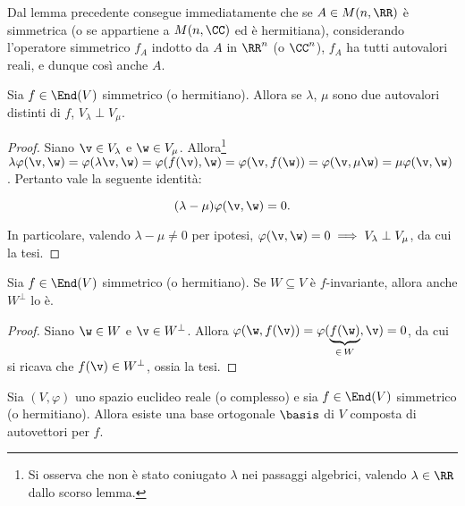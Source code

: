 \begin{remark}
	Dal lemma precedente consegue immediatamente che se $A \in M(n, \RR)$ è simmetrica (o se appartiene a
	$M(n, \CC)$ ed è hermitiana), considerando l'operatore simmetrico $f_A$ indotto da $A$ in $\RR^n$ (o $\CC^n$),
	$f_A$ ha tutti autovalori reali, e dunque così anche $A$. 
\end{remark}

\begin{lemma}
	Sia $f \in \End(V)$ simmetrico (o hermitiano). Allora se $\lambda$, $\mu$ sono due autovalori distinti
	di $f$, $V_\lambda \perp V_\mu$.
\end{lemma}

\begin{proof}
	Siano $\v \in V_\lambda$ e $\w \in V_\mu$. Allora\footnote{Si osserva che non è stato coniugato $\lambda$
		nei passaggi algebrici, valendo $\lambda \in \RR$ dallo scorso lemma.} $\lambda \varphi(\v, \w) = \varphi(\lambda \v, \w) = \varphi(f(\v), \w) = \varphi(\v, f(\w)) = \varphi(\v, \mu \w) = \mu \varphi(\v, \w)$.
	Pertanto vale la seguente identità:
	
	\[ (\lambda - \mu) \varphi(\v, \w) = 0. \]
	
	\vskip 0.05in
	
	In particolare, valendo $\lambda - \mu \neq 0$ per ipotesi, $\varphi(\v, \w) = 0 \implies V_\lambda \perp V_\mu$,
	da cui la tesi.
\end{proof}

\begin{lemma}
	Sia $f \in \End(V)$ simmetrico (o hermitiano). Se $W \subseteq V$ è $f$-invariante, allora anche
	$W^\perp$ lo è.
\end{lemma}

\begin{proof}
	Siano $\w \in W$ e $\v \in W^\perp$. Allora $\varphi(\w, f(\v)) = \varphi(\underbrace{f(\w)}_{\in \, W}, \v) = 0$, da cui si ricava che $f(\v) \in W^\perp$, ossia la tesi.
\end{proof}

\begin{theorem} 
	Sia $(V, \varphi)$ uno spazio euclideo reale (o complesso) e sia $f \in \End(V)$ simmetrico (o hermitiano). Allora esiste una base ortogonale $\basis$ di $V$ composta di autovettori per $f$.
\end{theorem}

